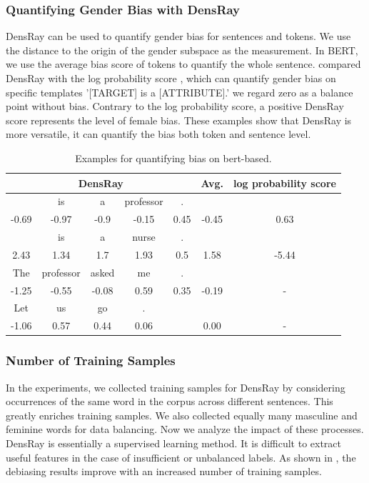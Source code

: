 \subsubsection{Quantifying Gender Bias with DensRay}
DensRay can be used to quantify gender bias for sentences and tokens. We use the distance to the origin of the gender subspace as the measurement. In BERT, we use the average bias score of tokens to quantify the whole sentence.  compared DensRay with the log probability score \cite{kurita2019measuring}, which can quantify gender bias on specific templates '[TARGET] is a [ATTRIBUTE].' we regard zero as a balance point without bias. Contrary to the log probability score, a positive DensRay score represents the level of female bias. These examples show that DensRay is more versatile, it can quantify the bias both token and sentence level.
\begin{table}[h]
	\centering
	\scriptsize
	\begin{tabular}{ccccccc}
		\hline
		\multicolumn{5}{c}{DensRay}&Avg.&log probability score\\		
		\hline
		[MASK] &is &a &professor& . &&\\
		-0.69 &-0.97 &-0.9  &-0.15  &0.45& -0.45& 0.63\\
		\hline
		[MASK] &is &a &nurse& . &&\\
		2.43  &1.34  &1.7   &1.93  &0.5& 1.58 &-5.44\\
		\hline
		The &professor &asked &me& . &&\\
		-1.25 &-0.55 &-0.08  &0.59  &0.35 &-0.19 &-\\
		\hline
		Let &us &go &.& &&\\
		-1.06  &0.57  &0.44  &0.06& &0.00 &-\\
		\hline
	\end{tabular}
	\caption{
		Examples for quantifying bias on bert-based.}
\end{table}



\subsubsection{Number of Training Samples}
In the experiments, we collected training samples for DensRay by considering occurrences of the same word in the corpus across different sentences. This greatly enriches training samples. We also collected equally many masculine and feminine words for data balancing. Now we analyze the impact of these processes. DensRay is essentially a supervised learning method. It is difficult to extract useful features in the case of insufficient or unbalanced labels.  As shown in , the debiasing results improve with an increased number of training samples.

